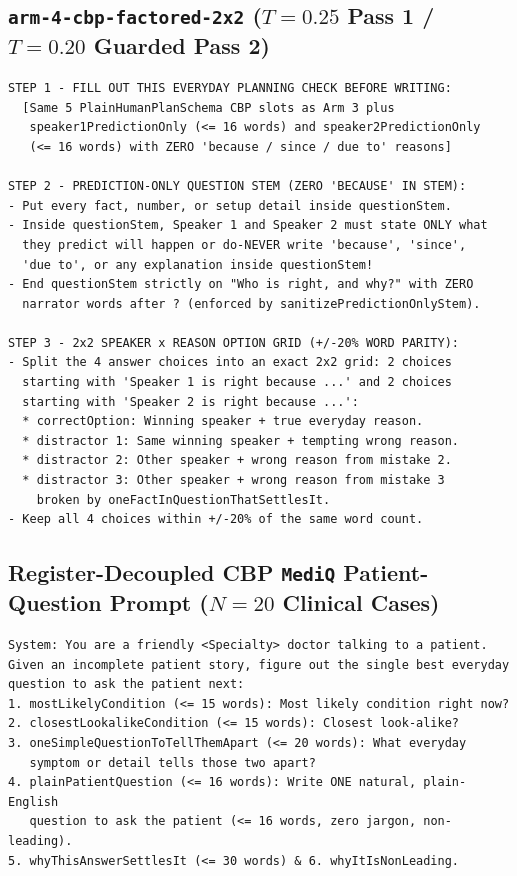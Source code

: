 \documentclass[11pt,a4paper]{article}
\begin{document}
\subsection{\texttt{arm-4-cbp-factored-2x2} ($T=0.25$ Pass 1 / $T=0.20$ Guarded Pass 2)}
{\small
\begin{verbatim}
STEP 1 - FILL OUT THIS EVERYDAY PLANNING CHECK BEFORE WRITING:
  [Same 5 PlainHumanPlanSchema CBP slots as Arm 3 plus
   speaker1PredictionOnly (<= 16 words) and speaker2PredictionOnly
   (<= 16 words) with ZERO 'because / since / due to' reasons]

STEP 2 - PREDICTION-ONLY QUESTION STEM (ZERO 'BECAUSE' IN STEM):
- Put every fact, number, or setup detail inside questionStem.
- Inside questionStem, Speaker 1 and Speaker 2 must state ONLY what
  they predict will happen or do-NEVER write 'because', 'since',
  'due to', or any explanation inside questionStem!
- End questionStem strictly on "Who is right, and why?" with ZERO
  narrator words after ? (enforced by sanitizePredictionOnlyStem).

STEP 3 - 2x2 SPEAKER x REASON OPTION GRID (+/-20% WORD PARITY):
- Split the 4 answer choices into an exact 2x2 grid: 2 choices
  starting with 'Speaker 1 is right because ...' and 2 choices
  starting with 'Speaker 2 is right because ...':
  * correctOption: Winning speaker + true everyday reason.
  * distractor 1: Same winning speaker + tempting wrong reason.
  * distractor 2: Other speaker + wrong reason from mistake 2.
  * distractor 3: Other speaker + wrong reason from mistake 3
    broken by oneFactInQuestionThatSettlesIt.
- Keep all 4 choices within +/-20% of the same word count.
\end{verbatim}
}

\subsection{Register-Decoupled CBP \texttt{MediQ} Patient-Question Prompt ($N=20$ Clinical Cases)}
{\small
\begin{verbatim}
System: You are a friendly <Specialty> doctor talking to a patient.
Given an incomplete patient story, figure out the single best everyday
question to ask the patient next:
1. mostLikelyCondition (<= 15 words): Most likely condition right now?
2. closestLookalikeCondition (<= 15 words): Closest look-alike?
3. oneSimpleQuestionToTellThemApart (<= 20 words): What everyday
   symptom or detail tells those two apart?
4. plainPatientQuestion (<= 16 words): Write ONE natural, plain-English
   question to ask the patient (<= 16 words, zero jargon, non-leading).
5. whyThisAnswerSettlesIt (<= 30 words) & 6. whyItIsNonLeading.
\end{verbatim}
}



\end{document}
